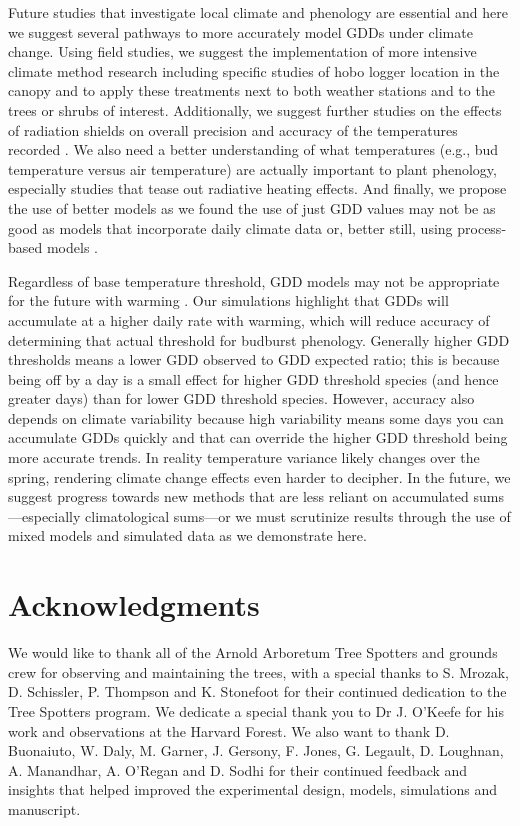 \documentclass{article}\usepackage[]{graphicx}\usepackage[]{color}
\begin{document}
Future studies that investigate local climate and phenology are essential and here we suggest several pathways to more accurately model GDDs under climate change. Using field studies, we suggest the implementation of more intensive climate method research including specific studies of hobo logger location in the canopy and to apply these treatments next to both weather stations and to the trees or shrubs of interest. Additionally, we suggest further studies on the effects of radiation shields on overall precision and accuracy of the temperatures recorded \citep{daCunha2015}. We also need a better understanding of what temperatures (e.g., bud temperature versus air temperature) are actually important to plant phenology, especially studies that tease out radiative heating effects. And finally, we propose the use of better models as we found the use of just GDD values may not be as good as models that incorporate daily climate data or, better still, using process-based models \citep{Keenan2019}. 
 
Regardless of base temperature threshold, GDD models may not be appropriate for the future with warming \citep{Man2010}. Our simulations highlight that GDDs will accumulate at a higher daily rate with warming, which will reduce accuracy of determining that actual threshold for budburst phenology. Generally higher GDD thresholds means a lower GDD observed to GDD expected ratio; this is because being off by a day is a small effect for higher GDD threshold species (and hence greater days) than for lower GDD threshold species. However, accuracy also depends on climate variability because high variability means some days you can accumulate GDDs quickly and that can override the higher GDD threshold being more accurate trends. In reality temperature variance likely changes over the spring, rendering climate change effects even harder to decipher. In the future, we suggest progress towards new methods that are less reliant on accumulated sums---especially climatological sums---or we must scrutinize results through the use of mixed models and simulated data as we demonstrate here.

\section*{Acknowledgments}
We would like to thank all of the Arnold Arboretum Tree Spotters and grounds crew for observing and maintaining the trees, with a special thanks to S. Mrozak, D. Schissler, P. Thompson and K. Stonefoot for their continued dedication to the Tree Spotters program. We dedicate a special thank you to Dr J. O'Keefe for his work and observations at the Harvard Forest. We also want to thank D. Buonaiuto, W. Daly, M. Garner, J. Gersony, F. Jones, G. Legault, D. Loughnan, A. Manandhar, A. O'Regan and D. Sodhi for their continued feedback and insights that helped improved the experimental design, models, simulations and manuscript. 
\end{document}
